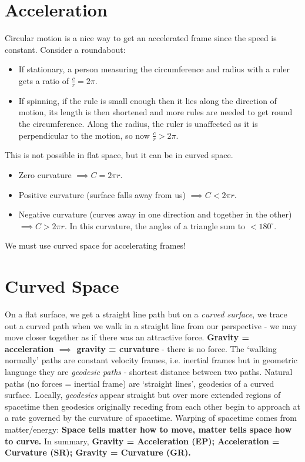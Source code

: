 \documentclass[a4paper, 11pt, normalem]{report}
\begin{document}
\section{Acceleration}
Circular motion is a nice way to get an accelerated frame since the speed is constant. 
Consider a roundabout:
\begin{itemize}
    \item If stationary, a person measuring the circumference and radius with a ruler gets a ratio of $\frac{c}{r}=2\pi$.
    \item If spinning, if the rule is small enough then it lies along the direction of motion, its length is then shortened and more rules are needed to get round the circumference. Along the radius, the ruler is unaffected as it is perpendicular to the motion, so now $\frac{c}{r}>2\pi$.
\end{itemize}
This is not possible in flat space, but it can be in curved space. 
\begin{itemize}
    \item Zero curvature $\implies C=2\pi r$.
    \item Positive curvature (surface falls away from us) $\implies C<2\pi r$.
    \item Negative curvature (curves away in one direction and together in the other) $\implies C>2\pi r$. In this curvature, the angles of a triangle sum to $<180^\circ$.
\end{itemize}
We must use curved space for accelerating frames!

\section{Curved Space}
On a flat surface, we get a straight line path but on a \emph{curved surface}, we trace out a curved path when we walk in a straight line from our perspective - we may move closer together as if there was an attractive force. 
\textbf{Gravity = acceleration $\implies$ gravity = curvature} - there is no force. 
The `walking normally' paths are constant velocity frames, i.e. inertial frames but in geometric language they are \emph{geodesic paths} - shortest distance between two paths. 
Natural paths (no forces = inertial frame) are `straight lines', geodesics of a curved surface.
Locally, \emph{geodesics} appear straight but over more extended regions of spacetime then geodesics originally receding from each other begin to approach at a rate governed by the curvature of spacetime. 
Warping of spacetime comes from matter/energy: \textbf{Space tells matter how to move, matter tells space how to curve.}
In summary, \textbf{Gravity = Acceleration (EP); Acceleration = Curvature (SR); Gravity = Curvature (GR).}
\end{document}
